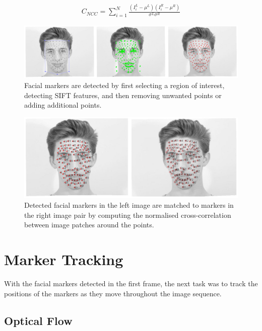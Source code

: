 \begin{equation}
\begin{aligned}
	C_{NCC} = \sum_{i=1}^N \frac{(I_i^L - \mu^L)(I_i^R - \mu^R)}{\sigma^L \sigma^R}
\end{aligned}
\end{equation}

\begin{figure}[htbp!]
\centering
\includegraphics[width=\textwidth]{img/detection}
	\caption{Facial markers are detected by first selecting a region of interest, detecting SIFT features, and then removing unwanted points or adding additional points.}
	\label{fig:detection}
\end{figure}

\begin{figure}[htbp!]
\centering
\includegraphics[width=\textwidth]{img/matching}
	\caption{Detected facial markers in the left image are matched to markers in the right image pair by computing the normalised cross-correlation between image patches around the points.}
	\label{fig:matching}
\end{figure}

\section{Marker Tracking}

With the facial markers detected in the first frame, the next task was to track the positions of the markers as they move throughout the image sequence. 

\subsection{Optical Flow}

